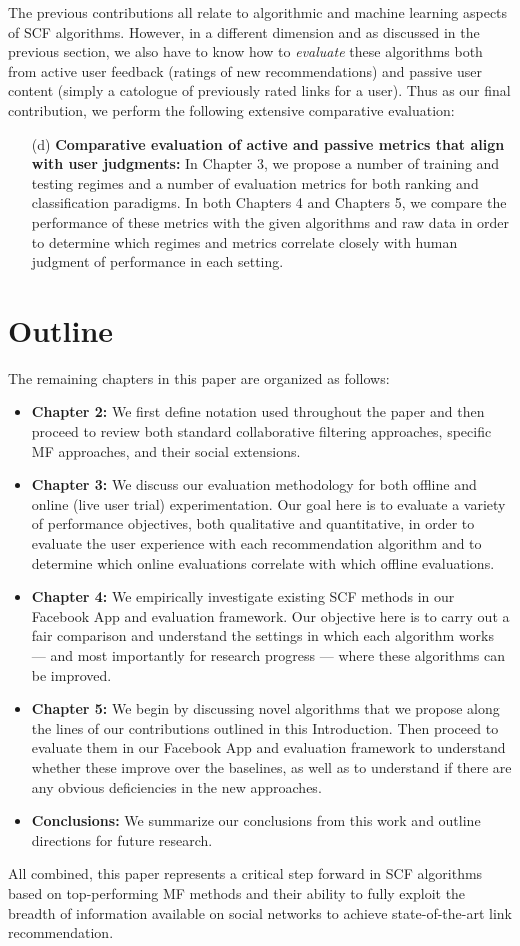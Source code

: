 The previous contributions all relate to algorithmic and machine
learning aspects of SCF algorithms.  However, in a different dimension
and as discussed in the previous section, we also have to know how to
\emph{evaluate} these algorithms both from active user feedback
(ratings of new recommendations) and passive user content (simply a
catologue of previously rated links for a user).  Thus as our final
contribution, we perform the following extensive comparative
evaluation:
\begin{enumerate}
\item[(d)] {\bf Comparative evaluation of active and passive metrics 
that align with user judgments:} 
In Chapter 3, we
propose a number of training and testing regimes and a number of
evaluation metrics for both ranking and classification paradigms.  In
both Chapters 4 and Chapters 5, we compare
the performance of these metrics with the given algorithms and raw
data in order to determine which regimes and metrics correlate closely
with human judgment of performance in each setting.
\end{enumerate}

\section{Outline}

The remaining chapters in this paper are organized as follows:
\begin{itemize}
\item {\bf Chapter 2:} We first define notation
used throughout the paper and then proceed to review both standard
collaborative filtering approaches, specific MF approaches, and
their social extensions.
\item {\bf Chapter 3:} We discuss our evaluation
methodology for both offline and online (live user trial) experimentation.
Our goal here is to evaluate a variety of performance objectives,
both qualitative and quantitative, in order to evaluate the user
experience with each recommendation algorithm and to determine
which online evaluations correlate with which offline evaluations.
\item {\bf Chapter 4:} We empirically investigate 
existing SCF methods in our Facebook App and evaluation framework.
Our objective here is to carry out a fair comparison and understand
the settings in which each algorithm works --- and most importantly
for research progress --- where these algorithms can be improved.
\item {\bf Chapter 5:} We begin by discussing novel
algorithms that we propose along the lines of our contributions
outlined in this Introduction. Then proceed to evaluate
them in our Facebook App and evaluation framework to understand
whether these improve over the baselines, as well as to understand
if there are any obvious deficiencies in the new approaches.
\item {\bf Conclusions:} We summarize our conclusions
from this work and outline directions for future research.
\end{itemize}

All combined, this paper represents a critical step forward in SCF
algorithms based on top-performing MF methods and their ability to
fully exploit the breadth of information available on social networks
to achieve state-of-the-art link recommendation.

